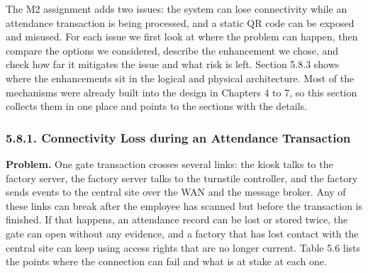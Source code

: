 The M2 assignment adds two issues: the system can lose connectivity while an attendance transaction is being processed, and a static QR code can be exposed and misused. For each issue we first look at where the problem can happen, then compare the options we considered, describe the enhancement we chose, and check how far it mitigates the issue and what risk is left. Section 5.8.3 shows where the enhancements sit in the logical and physical architecture. Most of the mechanisms were already built into the design in Chapters 4 to 7, so this section collects them in one place and points to the sections with the details.

\subsubsection*{5.8.1. Connectivity Loss during an Attendance Transaction}

{}

\textbf{Problem.} One gate transaction crosses several links: the kiosk talks to the factory server, the factory server talks to the turnstile controller, and the factory sends events to the central site over the WAN and the message broker. Any of these links can break after the employee has scanned but before the transaction is finished. If that happens, an attendance record can be lost or stored twice, the gate can open without any evidence, and a factory that has lost contact with the central site can keep using access rights that are no longer current. Table 5.6 lists the points where the connection can fail and what is at stake at each one.

